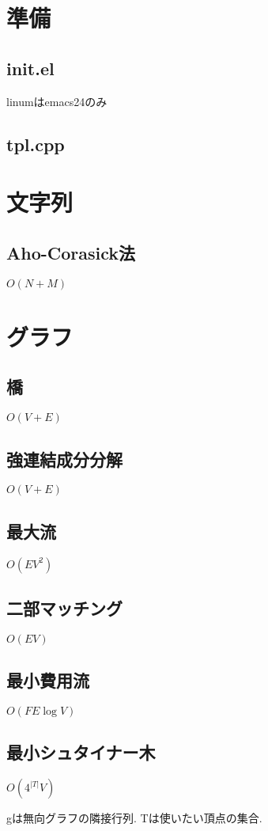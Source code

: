 \documentclass[10pt,twocolumn,a4j,landscape]{jsarticle}
\begin{document}
\tableofcontents
\newpage
%
%
\section{準備}
\subsection{init.el}
linumはemacs24のみ


\subsection{tpl.cpp}


\section{文字列}
\subsection{Aho-Corasick法}
$O(N+M)$\par


\section{グラフ}
\subsection{橋}
$O(V+E)$


\subsection{強連結成分分解}
$O(V+E)$\par


\subsection{最大流}
$O(EV^2)$\par


\subsection{二部マッチング}
$O(EV)$\par



\subsection{最小費用流}
$O(FE\log{V})$\par


\subsection{最小シュタイナー木}
$O(4^{|T|}V)$ \par
gは無向グラフの隣接行列. Tは使いたい頂点の集合.\par

\end{document}

